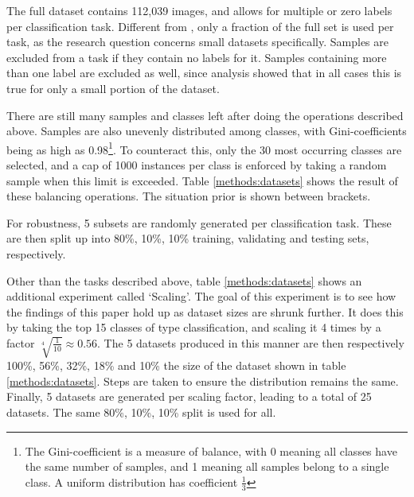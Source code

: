 The full dataset contains 112,039 images, and allows for multiple or zero labels per classification task. Different from \citeauthor{sabatelli2018deep}, only a fraction of the full set is used per task, as the research question concerns small datasets specifically. Samples are excluded from a task if they contain no labels for it. Samples containing more than one label are excluded as well, since analysis showed that in all cases this is true for only a small portion of the dataset.

There are still many samples and classes left after doing the operations described above. Samples are also unevenly distributed among classes, with Gini-coefficients being as high as 0.98\footnote{The Gini-coefficient is a measure of balance, with 0 meaning all classes have the same number of samples, and 1 meaning all samples belong to a single class. A uniform distribution has coefficient $\frac{1}{3}$}. To counteract this, only the 30 most occurring classes are selected, and a cap of 1000 instances per class is enforced by taking a random sample when this limit is exceeded. Table \ref{methods:datasets} shows the result of these balancing operations. The situation prior is shown between brackets.

For robustness, 5 subsets are randomly generated per classification task. These are then split up into 80\%, 10\%, 10\% training, validating and testing sets, respectively.

Other than the tasks described above, table \ref{methods:datasets} shows an additional experiment called `Scaling'. The goal of this experiment is to see how the findings of this paper hold up as dataset sizes are shrunk further. It does this by taking the top 15 classes of type classification, and scaling it 4 times by a factor $\sqrt[4]{\frac{1}{10}} \approx 0.56$. The 5 datasets produced in this manner are then respectively 100\%, 56\%, 32\%, 18\% and 10\% the size of the dataset shown in table \ref{methods:datasets}. Steps are taken to ensure the distribution remains the same. Finally, 5 datasets are generated per scaling factor, leading to a total of 25 datasets. The same 80\%, 10\%, 10\% split is used for all.


